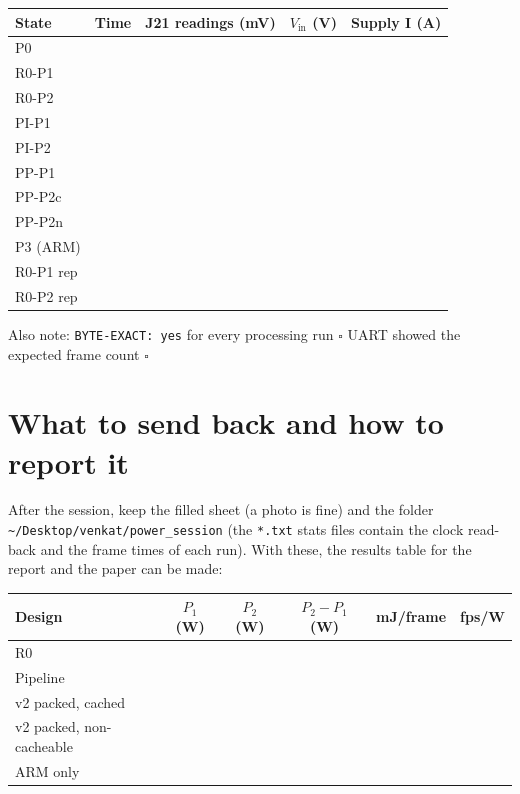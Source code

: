 \documentclass[11pt,a4paper]{article}
\begin{document}
\medskip
{\renewcommand{\arraystretch}{1.55}\small
\begin{tabularx}{\textwidth}{|p{1.45cm}|p{1.25cm}|X|X|X|X|X|X|p{1.1cm}|p{1.1cm}|}
\hline
\textbf{State} & \textbf{Time} & \multicolumn{6}{c|}{\textbf{J21 readings (mV)}} & $V_\mathrm{in}$ (V) & Supply I (A) \\ \hline
P0 & & & & & & & & & \\ \hline
R0-P1 & & & & & & & & & \\ \hline
R0-P2 & & & & & & & & & \\ \hline
PI-P1 & & & & & & & & & \\ \hline
PI-P2 & & & & & & & & & \\ \hline
PP-P1 & & & & & & & & & \\ \hline
PP-P2c & & & & & & & & & \\ \hline
PP-P2n & & & & & & & & & \\ \hline
P3 (ARM) & & & & & & & & & \\ \hline
R0-P1 rep & & & & & & & & & \\ \hline
R0-P2 rep & & & & & & & & & \\ \hline
\end{tabularx}}

\medskip
Also note: \texttt{BYTE-EXACT: yes} for every processing run \hfill $\square$ \quad UART showed the expected frame count \hfill $\square$

\section{What to send back and how to report it}\label{sec:report}

After the session, keep the filled sheet (a photo is fine) and the folder\\ \texttt{\textasciitilde/Desktop/venkat/power\_session} (the \texttt{*.txt} stats files contain the clock read-back and the frame times of each run). With these, the results table for the report and the paper can be made:

\begin{tabularx}{\textwidth}{@{}lccccc@{}}
\toprule
\textbf{Design} & $P_1$ (W) & $P_2$ (W) & $P_2-P_1$ (W) & mJ/frame & fps/W \\ \midrule
R0 & & & & & \\
Pipeline & & & & & \\
v2 packed, cached & & & & & \\
v2 packed, non-cacheable & & & & & \\
ARM only & & & & & \\
\bottomrule
\end{tabularx}
\end{document}
